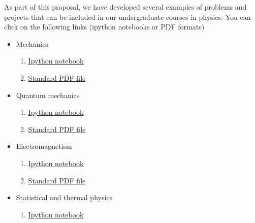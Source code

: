 \documentclass[%
oneside,                 %
final,                   %
10pt]{article}
\begin{document}
As part of this proposal, we have developed several examples of problems and projects that can be included in our undergraduate courses in physics. You can click on the following links (ipython notebooks or PDF formats)
\begin{itemize}
\item Mechanics
\begin{enumerate}

  \item \href{{https://github.com/CompPhysics/PAComputationsMSU/tree/master/doc/pub/Mechanics/ipynb}}{Ipython notebook}

  \item \href{{https://github.com/CompPhysics/PAComputationsMSU/tree/master/doc/pub/Mechanics/pdf/Mechanics-minted.pdf}}{Standard PDF file}

\end{enumerate}

\noindent
\item Quantum mechanics
\begin{enumerate}

  \item \href{{https://github.com/CompPhysics/PAComputationsMSU/tree/master/doc/pub/Quantum/ipynb}}{Ipython notebook}

  \item \href{{https://github.com/CompPhysics/PAComputationsMSU/tree/master/doc/pub/Quantum/pdf/Quantum-minted.pdf}}{Standard PDF file}

\end{enumerate}

\noindent
\item Electromagnetism
\begin{enumerate}

  \item \href{{https://github.com/CompPhysics/PAComputationsMSU/tree/master/doc/pub/Elmag/ipynb}}{Ipython notebook}

  \item \href{{https://github.com/CompPhysics/PAComputationsMSU/tree/master/doc/pub/Elmag/pdf/Elmag-minted.pdf}}{Standard PDF file}

\end{enumerate}

\noindent
\item Statistical and thermal physics
\begin{enumerate}

  \item \href{{https://github.com/CompPhysics/PAComputationsMSU/tree/master/doc/pub/StatPhys/ipynb}}{Ipython notebook}


\end{enumerate}
\end{itemize}
\end{document}
